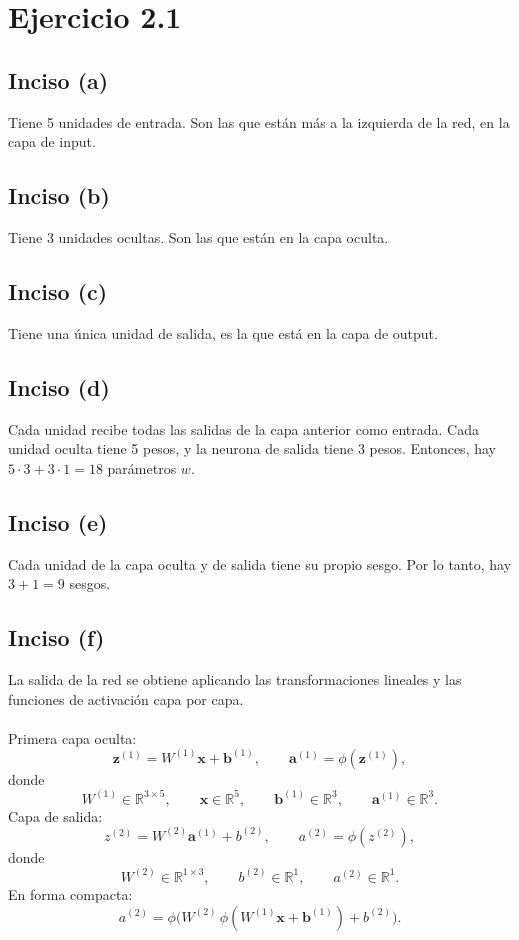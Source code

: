 \documentclass{article}
\begin{document}
    \section*{Ejercicio 2.1}
        \subsection*{Inciso (a)}
            Tiene 5 unidades de entrada. Son las que están más a la izquierda de la red, en la capa de input.
        \subsection*{Inciso (b)}
            Tiene 3 unidades ocultas. Son las que están en la capa oculta.
        \subsection*{Inciso (c)}
            Tiene una única unidad de salida, es la que está en la capa de output.
        \subsection*{Inciso (d)}
            Cada unidad recibe todas las salidas de la capa anterior como entrada. Cada unidad oculta tiene 5 pesos, y la neurona de salida tiene 3 pesos. Entonces, hay \(5 \cdot 3 + 3 \cdot 1 = 18\) parámetros $w$.
        \subsection*{Inciso (e)}
            Cada unidad de la capa oculta y de salida tiene su propio sesgo. Por lo tanto, hay $3+1 = 9$ sesgos.
        \subsection*{Inciso (f)}
            La salida de la red se obtiene aplicando las transformaciones lineales y las funciones de activación capa por capa. \\
            \\
            \noindent Primera capa oculta:
            \[
                \mathbf{z}^{(1)} = W^{(1)} \mathbf{x} + \mathbf{b}^{(1)},
                \qquad
                \mathbf{a}^{(1)} = \phi\!\left( \mathbf{z}^{(1)} \right),
            \]
            donde
            \[
                W^{(1)} \in \mathbb{R}^{3 \times 5}, \qquad
                \mathbf{x} \in \mathbb{R}^{5}, \qquad
                \mathbf{b}^{(1)} \in \mathbb{R}^{3}, \qquad
                \mathbf{a}^{(1)} \in \mathbb{R}^{3}.
            \]
            \noindent Capa de salida:
            \[
                z^{(2)} = W^{(2)} \mathbf{a}^{(1)} + b^{(2)},
                \qquad
                a^{(2)} = \phi\!\left( z^{(2)} \right),
            \]
            donde
            \[
                W^{(2)} \in \mathbb{R}^{1 \times 3}, 
                \qquad
                b^{(2)} \in \mathbb{R}^{1},
                \qquad
                a^{(2)} \in \mathbb{R}^{1}.
            \]
            \noindent En forma compacta:
            \[
                a^{(2)} = 
                \phi\!\Big(
                W^{(2)} \, \phi\!\left( W^{(1)} \mathbf{x} + \mathbf{b}^{(1)} \right)
                + b^{(2)}
                \Big).
            \]
\end{document}
